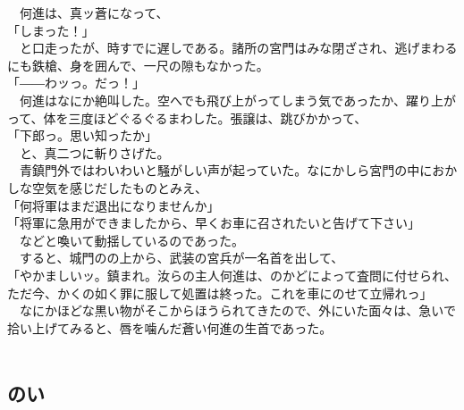 \documentclass[
  paper=a5,
  fontsize=10pt,
  jafontsize=9.5pt,
  tate,                  %
  open_bracket_pos=nibu, %
]{jlreq}
\begin{document}
　何進は、真ッ蒼になって、\\


「しまった！」\\


　と口走ったが、時すでに遅しである。諸所の宮門はみな閉ざされ、逃げまわるにも鉄槍、身を囲んで、一尺の隙もなかった。\\


「――わッっ。だっ！」\\


　何進はなにか絶叫した。空へでも飛び上がってしまう気であったか、躍り上がって、体を三度ほどぐるぐるまわした。張譲は、跳びかかって、\\


「下郎っ。思い知ったか」\\


　と、真二つに斬りさげた。\\


　青鎮門外ではわいわいと騒がしい声が起っていた。なにかしら宮門の中におかしな空気を感じだしたものとみえ、\\


「何将軍はまだ退出になりませんか」\\


「将軍に急用ができましたから、早くお車に召されたいと告げて下さい」\\


　などと喚いて動揺しているのであった。\\


　すると、城門のの上から、武装の宮兵が一名首を出して、\\


「やかましいッ。鎮まれ。汝らの主人何進は、のかどによって査問に付せられ、ただ今、かくの如く罪に服して処置は終った。これを車にのせて立帰れっ」\\


　なにかほどな黒い物がそこからほうられてきたので、外にいた面々は、急いで拾い上げてみると、唇を噛んだ蒼い何進の生首であった。\\

\\

\subsection{のい}

\\
\end{document}
